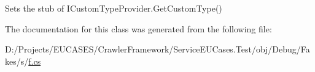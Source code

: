 Sets the stub of I\-Custom\-Type\-Provider.\-Get\-Custom\-Type()



The documentation for this class was generated from the following file\-:\begin{DoxyCompactItemize}
\item 
D\-:/\-Projects/\-E\-U\-C\-A\-S\-E\-S/\-Crawler\-Framework/\-Service\-E\-U\-Cases.\-Test/obj/\-Debug/\-Fakes/s/\hyperlink{s_2f_8cs}{f.\-cs}\end{DoxyCompactItemize}
